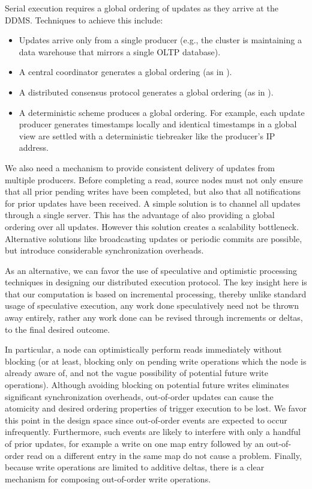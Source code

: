 Serial execution requires a global ordering of updates as they arrive at
the DDMS. Techniques to achieve this include:
\begin{itemize}
\item Updates arrive only from a single producer (e.g., the cluster is
maintaining a data warehouse that mirrors a single OLTP database).
\item A central coordinator generates a global ordering (as in
\cite{peng-incremental:10}).
\item A distributed consensus protocol generates a global ordering (as in
\cite{Junqueira:2009:LTZ:1582716.1582721}).
\item A deterministic scheme produces a global ordering. For example, each
update producer generates timestamps locally and identical timestamps in a
global view are settled with a deterministic tiebreaker like the producer's IP
address.
\end{itemize}

We also need a mechanism to provide consistent delivery of updates from multiple
producers. Before completing a read, source nodes must not only ensure that all
prior pending writes have been completed, but also that all notifications for
prior updates have been received.
A simple solution is to channel all updates through a single server. This has
the advantage of also providing a global ordering over all updates.  However
this solution creates a scalability bottleneck.  Alternative solutions like
broadcasting updates or periodic commits are possible, but introduce
considerable synchronization overheads.

As an alternative, we can favor the use of speculative and optimistic processing
techniques in designing our distributed execution protocol. The key insight here
is that our computation is based on incremental processing, thereby unlike
standard usage of speculative execution, any work done speculatively need not be
thrown away entirely, rather any work done can be revised through increments or
deltas, to the final desired outcome.

In particular, a node can optimistically perform reads immediately without
blocking (or at least, blocking only on pending write operations which the node
is already aware of, and not the vague possibility of potential future write
operations).  Although avoiding blocking on potential future writes eliminates
significant synchronization overheads, out-of-order updates can cause the
atomicity and desired ordering properties of trigger execution to be lost.
We favor this point in the design space since out-of-order events are expected
to occur infrequently. Furthermore, such events are likely to interfere with
only a handful of prior updates, for example a write on one map entry followed
by an out-of-order read on a different entry in the same map do not cause a
problem. Finally, because write operations are limited to additive deltas,
there is a clear mechanism for composing out-of-order write operations.

